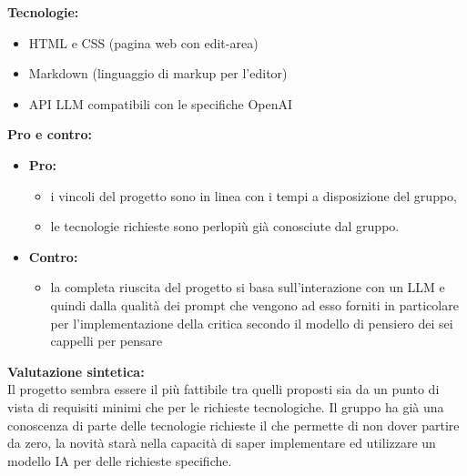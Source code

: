 \vspace{0.3cm}
\textbf{Tecnologie:}
\begin{itemize}
	\item HTML e CSS (pagina web con edit-area)
    \item Markdown (linguaggio di markup per l'editor)
    \item API LLM compatibili con le specifiche OpenAI
\end{itemize}

\vspace{0.3cm}
\textbf{Pro e contro:}
\begin{itemize}
	\item \textbf{Pro:}
        \begin{itemize}
            \item i vincoli del progetto sono in linea con i tempi a disposizione del gruppo,
            \item le tecnologie richieste sono perlopiù già conosciute dal gruppo.
        \end{itemize}
	\item \textbf{Contro:}
        \begin{itemize}
            \item la completa riuscita del progetto si basa sull'interazione con un LLM e quindi dalla qualità dei prompt che vengono ad esso forniti in particolare per l’implementazione della critica secondo il modello di pensiero dei sei cappelli per pensare
        \end{itemize}
\end{itemize}

\vspace{0.3cm}
\textbf{Valutazione sintetica:} \\
Il progetto sembra essere il più fattibile tra quelli proposti sia da un punto di vista di requisiti minimi che per le richieste tecnologiche.
Il gruppo ha già una conoscenza di parte delle tecnologie richieste il che permette di non dover partire da zero, la novità starà nella capacità di saper implementare ed utilizzare un modello IA per delle richieste specifiche.
\newpage